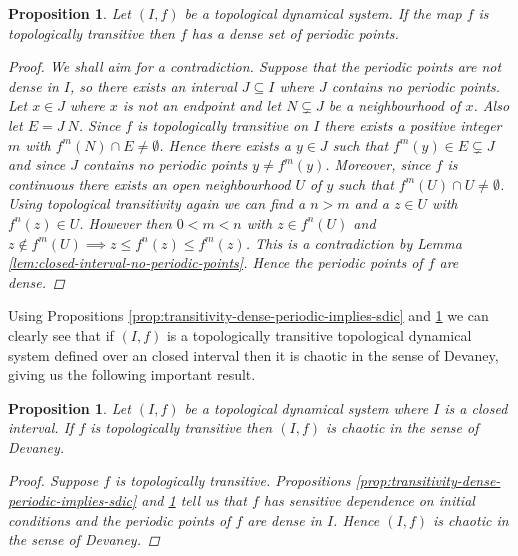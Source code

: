 \documentclass[11pt,a4paper,oneside]{memoir}
\theoremstyle{plain}
\newtheorem{prop}[thm]{Proposition}
\theoremstyle{definition}
\begin{document}
\begin{prop} \label{prop:transitivity-interval-implies-dense-periodic}
    Let $(I, f)$ be a topological dynamical system. If the map $f$ is topologically transitive then $f$ has a dense set of periodic points.
    \begin{proof}
        We shall aim for a contradiction. Suppose that the periodic points are not dense in $I$, so there exists an interval $J \subseteq I$ where $J$ contains no periodic points. Let $x \in J$ where $x$ is not an endpoint and let $N \subsetneq J$ be a neighbourhood of $x$. Also let $E = J \ N$. Since $f$ is topologically transitive on $I$ there exists a positive integer $m$ with $f^m(N) \cap E \neq \emptyset$. Hence there exists a $y \in J$ such that $f^m(y) \in E \subsetneq J$ and since $J$ contains no periodic points $y \neq f^m(y)$. Moreover, since $f$ is continuous there exists an open neighbourhood $U$ of $y$ such that $f^m(U) \cap U \neq \emptyset$. Using topological transitivity again we can find a $n > m$ and a $z \in U$ with $f^n(z) \in U$. However then $0 < m < n$ with $z \in f^n(U)$ and $z \notin f^m(U) \implies z \leq f^n(z) \leq f^m(z)$. This is a contradiction by Lemma \ref{lem:closed-interval-no-periodic-points}. Hence the periodic points of $f$ are dense.
    \end{proof}
\end{prop}

Using Propositions \ref{prop:transitivity-dense-periodic-implies-sdic} and \ref{prop:transitivity-interval-implies-dense-periodic} we can clearly see that if $(I, f)$ is a topologically transitive topological dynamical system defined over an closed interval then it is chaotic in the sense of Devaney, giving us the following important result.

\begin{prop}\label{prop:chaotic-transitive}
    Let $(I, f)$ be a topological dynamical system where $I$ is a closed interval. If $f$ is topologically transitive then $(I, f)$ is chaotic in the sense of Devaney.
    \begin{proof}
        Suppose $f$ is topologically transitive. Propositions \ref{prop:transitivity-dense-periodic-implies-sdic} and \ref{prop:transitivity-interval-implies-dense-periodic} tell us that $f$ has sensitive dependence on initial conditions and the periodic points of $f$ are dense in $I$. Hence $(I, f)$ is chaotic in the sense of Devaney.
    \end{proof}
\end{prop}
\end{document}

